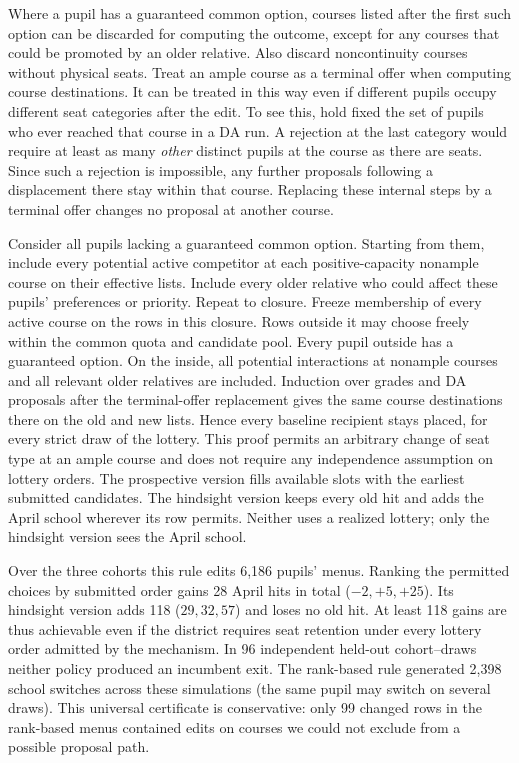 Where a pupil has a guaranteed common option, courses listed after the first such option can be discarded for computing the outcome, except for any courses that could be promoted by an older relative. Also discard noncontinuity courses without physical seats. Treat an ample course as a terminal offer when computing course destinations. It can be treated in this way even if different pupils occupy different seat categories after the edit. To see this, hold fixed the set of pupils who ever reached that course in a DA run. A rejection at the last category would require at least as many \emph{other} distinct pupils at the course as there are seats. Since such a rejection is impossible, any further proposals following a displacement there stay within that course. Replacing these internal steps by a terminal offer changes no proposal at another course.

Consider all pupils lacking a guaranteed common option. Starting from them, include every potential active competitor at each positive-capacity nonample course on their effective lists. Include every older relative who could affect these pupils' preferences or priority. Repeat to closure. Freeze membership of every active course on the rows in this closure. Rows outside it may choose freely within the common quota and candidate pool. Every pupil outside has a guaranteed option. On the inside, all potential interactions at nonample courses and all relevant older relatives are included. Induction over grades and DA proposals after the terminal-offer replacement gives the same course destinations there on the old and new lists. Hence every baseline recipient stays placed, for every strict draw of the lottery. This proof permits an arbitrary change of seat type at an ample course and does not require any independence assumption on lottery orders. The prospective version fills available slots with the earliest submitted candidates. The hindsight version keeps every old hit and adds the April school wherever its row permits. Neither uses a realized lottery; only the hindsight version sees the April school.

Over the three cohorts this rule edits 6,186 pupils' menus. Ranking the permitted choices by submitted order gains 28 April hits in total ($-2,+5,+25$). Its hindsight version adds 118 ($29,32,57$) and loses no old hit. At least 118 gains are thus achievable even if the district requires seat retention under every lottery order admitted by the mechanism. In 96 independent held-out cohort--draws neither policy produced an incumbent exit. The rank-based rule generated 2,398 school switches across these simulations (the same pupil may switch on several draws). This universal certificate is conservative: only 99 changed rows in the rank-based menus contained edits on courses we could not exclude from a possible proposal path.

